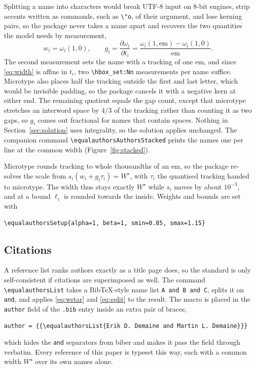\documentclass[10pt,twocolumn]{article}
\newcommand{\tex}{\lstinline[style=latex]}
\newcommand{\code}{\lstinline}
\theoremstyle{plain}
\theoremstyle{definition}
\begin{document}
  Splitting a name into characters would break UTF-8 input on 8-bit engines, strip accents written as commands, such as \tex|\"o|, of their argument, and lose kerning pairs, so the package never takes a name apart and recovers the two quantities the model needs by measurement,
  \begin{equation}
    w_i = \omega_i(1, 0), \qquad g_i = \frac{\partial \omega_i}{\partial t_i} = \frac{\omega_i(1, \mathrm{em}) - \omega_i(1, 0)}{\mathrm{em}} .
    \label{eq:measure}
  \end{equation}
  The second measurement sets the name with a tracking of one em, and since \eqref{eq:width} is affine in $t_i$, two \tex|\hbox_set:Nn| measurements per name suffice.
  Microtype also places half the tracking outside the first and last letter, which would be invisible padding, so the package cancels it with a negative kern at either end.
  The remaining quotient equals the gap count, except that microtype stretches an interword space by $4/3$ of the tracking rather than counting it as two gaps, so $g_i$ comes out fractional for names that contain spaces.
  Nothing in Section~\ref{sec:solution} uses integrality, so the solution applies unchanged.
  The companion command \tex|\equalauthorsAuthorsStacked| prints the names one per line at the common width (Figure~\ref{fig:stacked}).

  Microtype rounds tracking to whole thousandths of an em, so the package re-solves the scale from $s_i (w_i + g_i \tau_i) = W^\star$, with $\tau_i$ the quantised tracking handed to microtype.
  The width thus stays exactly $W^\star$ while $s_i$ moves by about $10^{-3}$, and at a bound $\ell_i$ is rounded towards the inside.
  Weights and bounds are set with
  \begin{lstlisting}[style=latex, gobble=4]
    \equalauthorsSetup{alpha=1, beta=1, smin=0.85, smax=1.15}
  \end{lstlisting}

  \subsection{Citations}
  A reference list ranks authors exactly as a title page does, so the standard is only self-consistent if citations are superimposed as well.
  The command \tex|\equalauthorsList| takes a BibTeX-style name list \code|A and B and C|, splits it on \code|and|, and applies \eqref{eq:wstar} and \eqref{eq:split} to the result.
  The macro is placed in the \code|author| field of the \code|.bib| entry inside an extra pair of braces,
  \begin{lstlisting}[style=latex, gobble=4]
    author = {{\equalauthorsList{Erik D. Demaine and Martin L. Demaine}}}
  \end{lstlisting}
  which hides the \code|and| separators from biber and makes it pass the field through verbatim.
  Every reference of this paper is typeset this way, each with a common width $W^\star$ over its own names alone.
\end{document}
